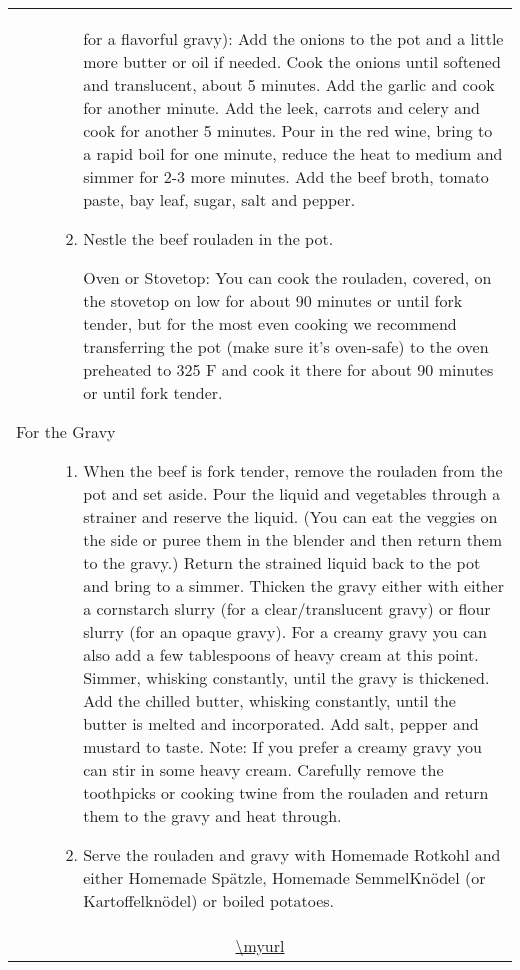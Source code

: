 \documentclass[web-recipes.tex]{subfiles}
\begin{document}
\begin{mdframed}[nobreak]
\begin{tabular}{l}
\begin{minipage}[t]{0.55\textwidth}
\begin{description}
\begin{enumerate}
              for a flavorful gravy): Add the onions to the pot and a little more
              butter or oil if needed. Cook the onions until softened and
              translucent, about 5 minutes. Add the garlic and cook for another
              minute. Add the leek, carrots and celery and cook for another 5
              minutes. Pour in the red wine, bring to a rapid boil for one minute,
              reduce the heat to medium and simmer for 2-3 more minutes. Add the beef
              broth, tomato paste, bay leaf, sugar, salt and pepper.
            \item Nestle the beef rouladen in the pot.

              Oven or Stovetop: You can cook the rouladen, covered, on the stovetop
              on low for about 90 minutes or until fork tender, but for the most even
              cooking we recommend transferring the pot (make sure it's oven-safe) to
              the oven preheated to 325 F and cook it there for about 90 minutes or
              until fork tender.
            \end{enumerate}
            \item[For the Gravy] \hfill
              \begin{enumerate}
              \item When the beef is fork tender, remove the rouladen from the pot and
                set aside. Pour the liquid and vegetables through a strainer and
                reserve the liquid. (You can eat the veggies on the side or puree them
                in the blender and then return them to the gravy.) Return the strained
                liquid back to the pot and bring to a simmer. Thicken the gravy either
                with either a cornstarch slurry (for a clear/translucent gravy) or
                flour slurry (for an opaque gravy). For a creamy gravy you can also add
                a few tablespoons of heavy cream at this point. Simmer, whisking
                constantly, until the gravy is thickened. Add the chilled butter,
                whisking constantly, until the butter is melted and incorporated. Add
                salt, pepper and mustard to taste. Note: If you prefer a creamy gravy
                you can stir in some heavy cream. Carefully remove the toothpicks or
                cooking twine from the rouladen and return them to the gravy and heat
                through.
              \item Serve the rouladen and gravy with Homemade Rotkohl and either
                Homemade Spätzle, Homemade SemmelKnödel (or Kartoffelknödel) or boiled
                potatoes.
              \end{enumerate}
          \end{description}
        \end{minipage} \vspace{3ex}\\
        \multicolumn{1}{c}{\small\ttfamily \url{\myurl}} \\
      \end{tabular}
    \end{mdframed}
    
\end{document}
